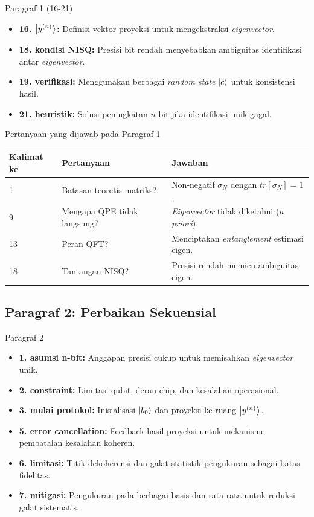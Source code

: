 \begin{frame}{Paragraf 1 (16-21)}
    \begin{itemize}
        \item \textbf{16. $\ket{y^{(n)}}$:} Definisi vektor proyeksi untuk mengekstraksi \textit{eigenvector}.
        \item \textbf{18. kondisi NISQ:} Presisi bit rendah menyebabkan ambiguitas identifikasi antar \textit{eigenvector}.
        \item \textbf{19. verifikasi:} Menggunakan berbagai \textit{random state} $\ket{c}$ untuk konsistensi hasil.
        \item \textbf{21. heuristik:} Solusi peningkatan $n$-bit jika identifikasi unik gagal.
    \end{itemize}
\end{frame}

\begin{frame}{Pertanyaan yang dijawab pada Paragraf 1}
    \centering
    \small
    \begin{tabular}{lp{4.5cm}p{6cm}}
        \toprule
        Kalimat ke & Pertanyaan & Jawaban \\
        \midrule
        1 & Batasan teoretis matriks? & Non-negatif $\sigma_N$ dengan $tr[\sigma_N]=1$. \\
        9 & Mengapa QPE tidak langsung? & \textit{Eigenvector} tidak diketahui (\textit{a priori}). \\
        13 & Peran QFT? & Menciptakan \textit{entanglement} estimasi eigen. \\
        18 & Tantangan NISQ? & Presisi rendah memicu ambiguitas eigen. \\
        \bottomrule
    \end{tabular}
\end{frame}

\subsection{Paragraf 2: Perbaikan Sekuensial}
\begin{frame}{Paragraf 2}
    \begin{itemize}
        \item \textbf{1. asumsi n-bit:} Anggapan presisi cukup untuk memisahkan \textit{eigenvector} unik.
        \item \textbf{2. constraint:} Limitasi qubit, derau chip, dan kesalahan operasional.
        \item \textbf{3. mulai protokol:} Inisialisasi $\ket{b_0}$ dan proyeksi ke ruang $\ket{y^{(n)}}$.
        \item \textbf{5. error cancellation:} Feedback hasil proyeksi untuk mekanisme pembatalan kesalahan koheren.
        \item \textbf{6. limitasi:} Titik dekoherensi dan galat statistik pengukuran sebagai batas fidelitas.
        \item \textbf{7. mitigasi:} Pengukuran pada berbagai basis dan rata-rata untuk reduksi galat sistematis.
    \end{itemize}
\end{frame}

